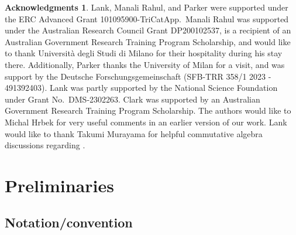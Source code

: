 \documentclass[11pt]{amsart}
\theoremstyle{plain}
\theoremstyle{definition}
\newtheorem*{ack}{Acknowledgments}
\numberwithin{equation}{section}
\numberwithin{theorem}{section}
\begin{document}
\begin{ack}
    Lank, Manali Rahul, and Parker were supported under the ERC Advanced Grant 101095900-TriCatApp.\ Manali Rahul was supported under the Australian Research Council Grant DP200102537, is a recipient of an Australian Government Research Training Program Scholarship, and would like to thank Universit\`{a} degli Studi di Milano for their hospitality during his stay there. Additionally, Parker thanks the University of Milan for a visit, and was support by the Deutsche Forschungsgemeinschaft (SFB-TRR 358/1 2023 - 491392403). Lank was partly supported by the National
    Science Foundation under Grant No.\ DMS-2302263. Clark was supported by an Australian Government Research Training Program Scholarship. The authors would like to Michal Hrbek for very useful comments in an earlier version of our work. Lank would like to thank Takumi Murayama for helpful commutative algebra discussions regarding \cite{Hochster:1973, Nagata:1962}.
\end{ack}

\section{Preliminaries}
\label{sec:prelim}

\subsection{Notation/convention}
\label{sec:prelim_notation}
\end{document}
